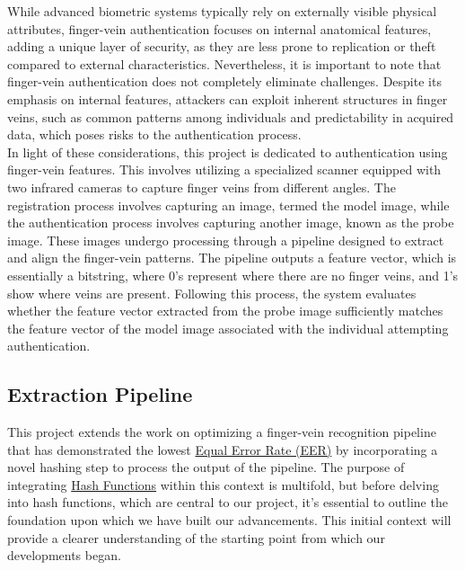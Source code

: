 While advanced biometric systems typically rely on externally visible physical attributes, finger-vein authentication focuses on internal anatomical features, adding a unique layer of security, as they are less prone to replication or theft compared to external characteristics. Nevertheless, it is important to note that finger-vein authentication does not completely eliminate challenges. Despite its emphasis on internal features, attackers can exploit inherent structures in finger veins, such as common patterns among individuals and predictability in acquired data, which poses risks to the authentication process.\\

In light of these considerations, this project is dedicated to authentication using finger-vein features.
This involves utilizing a specialized scanner equipped with two infrared cameras to capture finger veins from different angles.
The registration process involves capturing an image, termed the model image, while the authentication process involves capturing another image, known as the probe image. These images undergo processing through a pipeline designed to extract and align the finger-vein patterns.
The pipeline outputs a feature vector, which is essentially a bitstring, where 0's represent where there are no finger veins, and 1's show where veins are present.
Following this process, the system evaluates whether the feature vector extracted from the probe image sufficiently matches the feature vector of the model image associated with the individual attempting authentication.

\subsection{Extraction Pipeline}\label{sec:extraction-pipeline}

This project extends the work on optimizing a finger-vein recognition pipeline that has demonstrated the lowest \hyperref[def:EER]{Equal Error Rate (EER)} by incorporating a novel hashing step to process the output of the pipeline. The purpose of integrating \hyperref[def:Hash_Function]{Hash Functions} within this context is multifold, but before delving into hash functions, which are central to our project, it's essential to outline the foundation upon which we have built our advancements. This initial context will provide a clearer understanding of the starting point from which our developments began.\\

